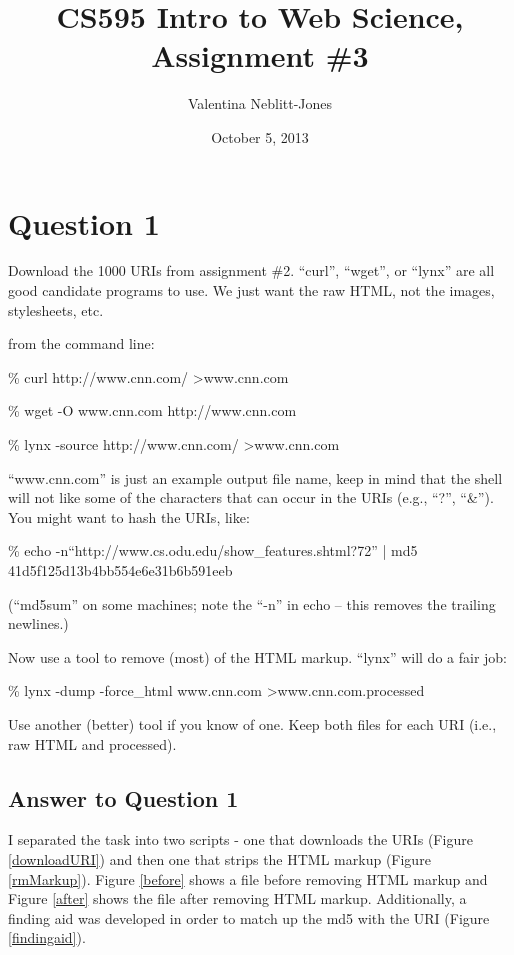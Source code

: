\documentclass{article}
\begin{document}
\title{CS595 Intro to Web Science, Assignment \#3}
\author{Valentina Neblitt-Jones}
\date{October 5, 2013}
\maketitle

\section*{Question 1}

Download the 1000 URIs from assignment \#2. ``curl'', ``wget'', or ``lynx'' are all good candidate programs to use. We just want the raw HTML, not the images, stylesheets, etc.

from the command line:

\% curl http://www.cnn.com/  \textgreater  www.cnn.com

\% wget -O www.cnn.com http://www.cnn.com

\% lynx -source http://www.cnn.com/ \textgreater www.cnn.com

``www.cnn.com'' is just an example output file name, keep in mind that the shell will not like some of the characters that can occur in the URIs (e.g., ``?'', ``\&''). You might want to hash the URIs, like:

\% echo -n``http://www.cs.odu.edu/show\_features.shtml?72'' | md5
41d5f125d13b4bb554e6e31b6b591eeb

(``md5sum'' on some machines; note the ``-n'' in echo -- this removes the trailing newlines.)

Now use a tool to remove (most) of the HTML markup. ``lynx'' will do a fair job:

\% lynx -dump -force\_html www.cnn.com \textgreater www.cnn.com.processed

Use another (better) tool if you know of one. Keep both files for each URI (i.e., raw HTML and processed).

\subsection*{Answer to Question 1}

I separated the task into two scripts - one that downloads the URIs (Figure \ref{downloadURI}) and then one that strips the HTML markup (Figure \ref{rmMarkup}). Figure \ref{before} shows a file before removing HTML markup and Figure \ref{after} shows the file after removing HTML markup. Additionally, a finding aid was developed in order to match up the md5 with the URI (Figure \ref{findingaid}).
\end{document}
